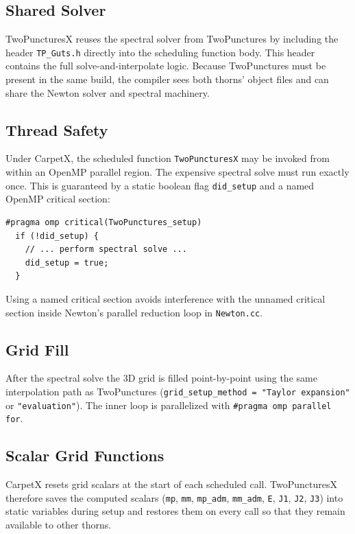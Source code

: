 \subsection{Shared Solver}

TwoPuncturesX reuses the spectral solver from TwoPunctures by including the
header \texttt{TP\_Guts.h} directly into the scheduling function body.  This
header contains the full solve-and-interpolate logic.  Because TwoPunctures
must be present in the same build, the compiler sees both thorns' object files
and can share the Newton solver and spectral machinery.

\subsection{Thread Safety}

Under CarpetX, the scheduled function \texttt{TwoPuncturesX} may be invoked
from within an OpenMP parallel region.  The expensive spectral solve must run
exactly once.  This is guaranteed by a static boolean flag \texttt{did\_setup}
and a named OpenMP critical section:

\begin{verbatim}
#pragma omp critical(TwoPunctures_setup)
  if (!did_setup) {
    // ... perform spectral solve ...
    did_setup = true;
  }
\end{verbatim}

Using a named critical section avoids interference with the unnamed critical
section inside Newton's parallel reduction loop in \texttt{Newton.cc}.

\subsection{Grid Fill}

After the spectral solve the 3D grid is filled point-by-point using the same
interpolation path as TwoPunctures (\texttt{grid\_setup\_method = "Taylor
expansion"} or \texttt{"evaluation"}).  The inner loop is parallelized with
\texttt{\#pragma omp parallel for}.

\subsection{Scalar Grid Functions}

CarpetX resets grid scalars at the start of each scheduled call.  TwoPuncturesX
therefore saves the computed scalars (\texttt{mp}, \texttt{mm}, \texttt{mp\_adm},
\texttt{mm\_adm}, \texttt{E}, \texttt{J1}, \texttt{J2}, \texttt{J3}) into
static variables during setup and restores them on every call so that they
remain available to other thorns.

